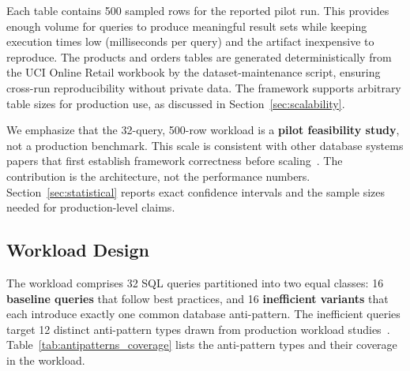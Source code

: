 \documentclass[conference]{IEEEtran}
\begin{document}
\begin{table}[t]
\caption{Dataset Characteristics}
\label{tab:datasets}
\centering
{}
\end{table}

Each table contains 500 sampled rows for the reported pilot run. This provides enough volume for queries to produce meaningful result sets while keeping execution times low (milliseconds per query) and the artifact inexpensive to reproduce. The products and orders tables are generated deterministically from the UCI Online Retail workbook by the dataset-maintenance script, ensuring cross-run reproducibility without private data. The framework supports arbitrary table sizes for production use, as discussed in Section~\ref{sec:scalability}.

We emphasize that the 32-query, 500-row workload is a \textbf{pilot feasibility study}, not a production benchmark. This scale is consistent with other database systems papers that first establish framework correctness before scaling~\cite{raasveldt2020duckdb}. The contribution is the architecture, not the performance numbers. Section~\ref{sec:statistical} reports exact confidence intervals and the sample sizes needed for production-level claims.

\subsection{Workload Design}
\label{sec:workload}
The workload comprises 32 SQL queries partitioned into two equal classes: 16 \textbf{baseline queries} that follow best practices, and 16 \textbf{inefficient variants} that each introduce exactly one common database anti-pattern. The inefficient queries target 12 distinct anti-pattern types drawn from production workload studies~\cite{bress2025snowflake,gcpantipattern}. Table~\ref{tab:antipatterns_coverage} lists the anti-pattern types and their coverage in the workload.
\end{document}
